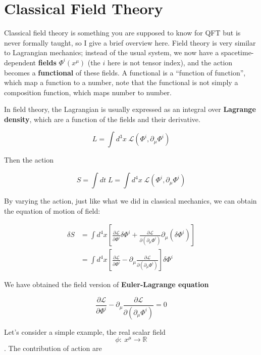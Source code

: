 \documentclass[12pt]{article}
\numberwithin{equation}{subsection}
\theoremstyle{mystyle}{\newtheorem{definition}{Definition}[subsection]}
\theoremstyle{mystyle}{\newtheorem{theorem}[definition]{Theorem}}
\theoremstyle{mystyle}{\newtheorem*{remark}{Remark}}
\theoremstyle{mystyle}{\newtheorem{example}{Example}[subsection]}
\theoremstyle{mystyle}{\newtheorem{examples}{Examples}[subsection]}
\theoremstyle{mystyle}{\newtheorem{cthm}{}[subsection]}
\newcommand{\p}{\partial}
\begin{document}
\section{Classical Field Theory}
Classical field theory is something you are supposed to know for QFT but is never formally taught, so I give a brief overview here.
Field theory is very similar to Lagrangian mechanics; instead of the usual system,
we now have a spacetime-dependent \textbf{fields} \(\Phi^i(x^\mu)\) (the \(i\) here is not tensor index),
and the action becomes a \textbf{functional} of these fields. A functional is a ``function of function'', which map a function to a number,
note that the functional is not simply a composition function, which maps number to number. \par
In field theory, the Lagrangian is usually expressed as an integral over \textbf{Lagrange density},
which are a function of the fields and their derivative.
\begin{cthm}
  \[L=\int d^3x\;\mathcal{L}(\Phi^i,\p_{\mu}\Phi^i)\]
\end{cthm}
Then the action
\begin{cthm}
  \[S=\int dt\;L = \int d^4x\;\mathcal{L}(\Phi^i,\p_{\mu}\Phi^i)\]
\end{cthm}
By varying the action, just like what we did in classical mechanics, we can obtain the equation of motion of field:
\begin{cthm}
  \begin{align*}
    \delta S & = \int d^4x\left[\frac{\p\mathcal{L}}{\p \Phi^i}\delta\Phi^i+
    \frac{\p\mathcal{L}}{\p(\p_\mu \Phi^i)}\p_\mu (\delta\Phi^i)\right]      \\
             & =\int d^4x\left[\frac{\p\mathcal{L}}{\p \Phi^i}-\p_\mu
      \frac{\p\mathcal{L}}{\p(\p_\mu \Phi^i)}\right]\delta\Phi^i
  \end{align*}
\end{cthm}
We have obtained the field version of \textbf{Euler-Lagrange equation}
\begin{cthm}
  \[\frac{\p\mathcal{L}}{\p \Phi^i}-\p_\mu
    \frac{\p\mathcal{L}}{\p(\p_\mu \Phi^i)}=0\]
\end{cthm}
Let's consider a simple example, the real scalar field \[\phi:\ x^{\mu} \rightarrow \mathbb{R}\].
The contribution of action are
\end{document}
